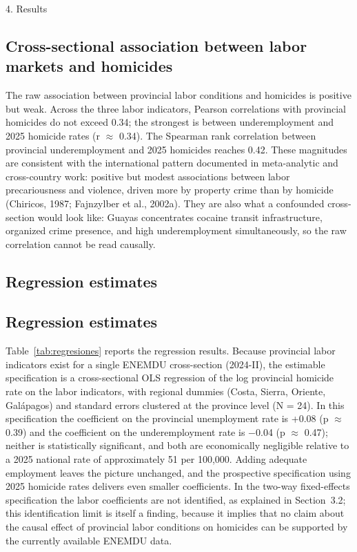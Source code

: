 4. Results



\subsection{Cross-sectional association between labor markets and homicides}



The raw association between provincial labor conditions and homicides is positive but weak. Across the three labor indicators, Pearson correlations with provincial homicides do not exceed 0.34; the strongest is between underemployment and 2025 homicide rates (r $\approx$ 0.34). The Spearman rank correlation between provincial underemployment and 2025 homicides reaches 0.42. These magnitudes are consistent with the international pattern documented in meta-analytic and cross-country work: positive but modest associations between labor precariousness and violence, driven more by property crime than by homicide (Chiricos, 1987; Fajnzylber et al., 2002a). They are also what a confounded cross-section would look like: Guayas concentrates cocaine transit infrastructure, organized crime presence, and high underemployment simultaneously, so the raw correlation cannot be read causally.



\subsection{Regression estimates}

\subsection{Regression estimates}

Table~\ref{tab:regresiones} reports the regression results. Because provincial labor indicators exist for a single ENEMDU cross-section (2024-II), the estimable specification is a cross-sectional OLS regression of the log provincial homicide rate on the labor indicators, with regional dummies (Costa, Sierra, Oriente, Gal\'apagos) and standard errors clustered at the province level (N = 24). In this specification the coefficient on the provincial unemployment rate is +0.08 (p $\approx$ 0.39) and the coefficient on the underemployment rate is $-$0.04 (p $\approx$ 0.47); neither is statistically significant, and both are economically negligible relative to a 2025 national rate of approximately 51 per 100,000. Adding adequate employment leaves the picture unchanged, and the prospective specification using 2025 homicide rates delivers even smaller coefficients. In the two-way fixed-effects specification the labor coefficients are not identified, as explained in Section~3.2; this identification limit is itself a finding, because it implies that no claim about the causal effect of provincial labor conditions on homicides can be supported by the currently available ENEMDU data.

